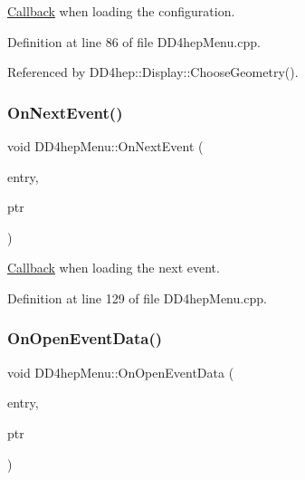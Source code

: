 \hyperlink{class_d_d4hep_1_1_callback}{Callback} when loading the configuration. 



Definition at line 86 of file D\+D4hep\+Menu.\+cpp.



Referenced by D\+D4hep\+::\+Display\+::\+Choose\+Geometry().

\hypertarget{class_d_d4hep_1_1_d_d4hep_menu_aed31811bd4340d374fb002792c17cecd}{}\label{class_d_d4hep_1_1_d_d4hep_menu_aed31811bd4340d374fb002792c17cecd} 
\subsubsection{\texorpdfstring{On\+Next\+Event()}{OnNextEvent()}}
{\footnotesize\ttfamily void D\+D4hep\+Menu\+::\+On\+Next\+Event (\begin{DoxyParamCaption}\item[{T\+G\+Menu\+Entry $\ast$}]{entry,  }\item[{void $\ast$}]{ptr }\end{DoxyParamCaption})}



\hyperlink{class_d_d4hep_1_1_callback}{Callback} when loading the next event. 



Definition at line 129 of file D\+D4hep\+Menu.\+cpp.

\hypertarget{class_d_d4hep_1_1_d_d4hep_menu_ac8428b7326df0a54c672ece045fe8d97}{}\label{class_d_d4hep_1_1_d_d4hep_menu_ac8428b7326df0a54c672ece045fe8d97} 
\subsubsection{\texorpdfstring{On\+Open\+Event\+Data()}{OnOpenEventData()}}
{\footnotesize\ttfamily void D\+D4hep\+Menu\+::\+On\+Open\+Event\+Data (\begin{DoxyParamCaption}\item[{T\+G\+Menu\+Entry $\ast$}]{entry,  }\item[{void $\ast$}]{ptr }\end{DoxyParamCaption})}



